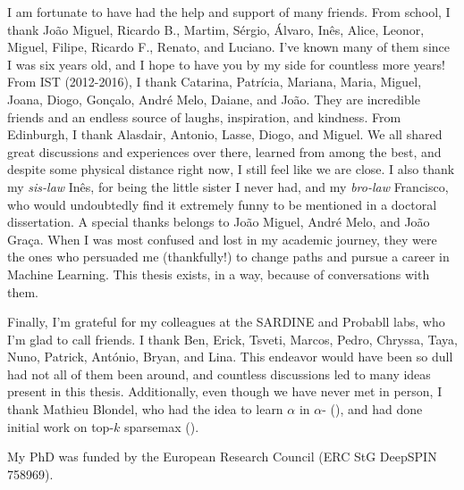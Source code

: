 \begin{acknowledgments}
    I am fortunate to have had the help and support of many friends.
    From school, I thank João Miguel, Ricardo B., Martim, Sérgio,
    Álvaro, Inês, Alice, Leonor, Miguel, Filipe, Ricardo F., Renato,
    and Luciano. I've known many of them since I was six years old,
    and I hope to have you by my side for countless more years! From
    IST (2012-2016), I thank Catarina, Patrícia, Mariana, Maria,
    Miguel, Joana, Diogo, Gonçalo, André Melo, Daiane, and João. They
    are incredible friends and an endless source of laughs,
    inspiration, and kindness. From Edinburgh, I thank Alasdair,
    Antonio, Lasse, Diogo, and Miguel. We all shared great
    discussions and experiences over there, learned from among the
    best, and despite some physical distance right now, I still feel
    like we are close. I also thank my \textit{sis-law} Inês, for
    being the little sister I never had, and my \textit{bro-law}
    Francisco, who would undoubtedly find it extremely funny to be
    mentioned in a doctoral dissertation. A special thanks belongs to
    João Miguel, André Melo, and João Graça. When I was most confused
    and lost in my academic journey, they were the ones who persuaded
    me (thankfully!) to change paths and pursue a career in Machine
    Learning. This thesis exists, in a way, because of conversations
    with them.
    
    Finally, I'm grateful for my colleagues at the SARDINE and
    Probabll labs, who I'm glad to call friends. I thank Ben, Erick,
    Tsveti, Marcos, Pedro, Chryssa, Taya, Nuno, Patrick, António,
    Bryan, and Lina. This endeavor would have been so dull had not
    all of them been around, and countless discussions led to many
    ideas present in this thesis. Additionally, even though we have
    never met in person, I thank Mathieu Blondel, who had the idea to
    learn $\alpha$ in $\alpha$-\entmaxtext
    (), and had done initial work on
    top-$k$ sparsemax ().
    
    My PhD was funded by the European Research Council (ERC
    StG DeepSPIN 758969).
    
\end{acknowledgments}
\clearpage
\thispagestyle{empty}
\cleardoublepage
